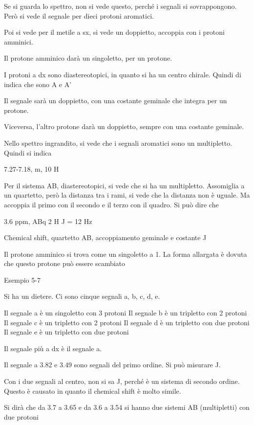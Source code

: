 Se si guarda lo spettro, non si vede questo, perché i segnali si
sovrappongono. Però si vede il segnale per dieci protoni aromatici.

Poi si vede per il metile a sx, si vede un doppietto, accoppia con i
protoni amminici.

Il protone amminico darà un singoletto, per un protone.

I protoni a dx sono diastereotopici, in quanto si ha un centro chirale.
Quindi di indica che sono A e A'

Il segnale sarà un doppietto, con una costante geminale che integra per
un protone.

Viceversa, l'altro protone darà un doppietto, sempre con una costante
geminale.

Nello spettro ingrandito, si vede che i segnali aromatici sono un
multipletto. Quindi si indica

7.27-7.18, m, 10 H

Per il sistema AB, diastereotopici, si vede che si ha un multipletto.
Assomiglia a un quartetto, però la distanza tra i rami, si vede che la
distanza non è uguale. Ma accoppia il primo con il secondo e il terzo
con il quadro. Si può dire che

3.6 ppm, ABq 2 H J = 12 Hz

Chemical shift, quartetto AB, accoppiamento geminale e costante J

Il protone amminico si trova come un singoletto a 1. La forma allargata
è dovuta che questo protone può essere scambiato

Esempio 5-7

Si ha un dietere. Ci sono cinque segnali a, b, c, d, e.

Il segnale a è un singoletto con 3 protoni Il segnale b è un tripletto
con 2 protoni Il segnale c è un tripletto con 2 protoni Il segnale d è
un tripletto con due protoni Il segnale e è un tripletto con due protoni

Il segnale più a dx è il segnale a.

Il segnale a 3.82 e 3.49 sono segnali del primo ordine. Si può misurare
J.

Con i due segnali al centro, non si sa J, perché è un sistema di secondo
ordine. Questo è causato in quanto il chemical shift è molto simile.

Si dirà che da 3.7 a 3.65 e da 3.6 a 3.54 si hanno due sistemi AB
(multipletti) con due protoni





